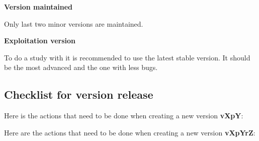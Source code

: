 \textbf{Version maintained}

Only last two minor versions are maintained.

\textbf{Exploitation version}

To do a study with \telemacsystem{} it is recommended to use the latest stable
version. It should be the most advanced and the one with less bugs.

\subsection{Checklist for version release}

Here is the actions that need to be done when creating a new version
\textbf{vXpY}\@:

Here are the actions that need to be done when creating a new version
\textbf{vXpYrZ}\@:

